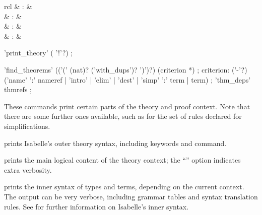 \begin{isabellebody}
\begin{isamarkuptext}
\begin{matharray}{rcl}
    \mbox{}\isa{{\isachardoublequote}\isactrlsup {\isacharasterisk}{\isachardoublequote}} & : &  \\
    \mbox{}\isa{{\isachardoublequote}\isactrlsup {\isacharasterisk}{\isachardoublequote}} & : &  \\
    \mbox{}\isa{{\isachardoublequote}\isactrlsup {\isacharasterisk}{\isachardoublequote}} & : &  \\
    \mbox{}\isa{{\isachardoublequote}\isactrlsup {\isacharasterisk}{\isachardoublequote}} & : &  \\
  \end{matharray}

  \begin{rail}
    'print\_theory' ( '!'?)
    ;

    'find\_theorems' (('(' (nat)? ('with\_dups')? ')')?) (criterion *)
    ;
    criterion: ('-'?) ('name' ':' nameref | 'intro' | 'elim' | 'dest' |
      'simp' ':' term | term)
    ;
    'thm\_deps' thmrefs
    ;
  \end{rail}

  These commands print certain parts of the theory and proof context.
  Note that there are some further ones available, such as for the set
  of rules declared for simplifications.

  \begin{descr}
  
  \item [\mbox{\isa{\isacommand{print{\isacharunderscore}commands}}}] prints Isabelle's outer theory
  syntax, including keywords and command.
  
  \item [\mbox{\isa{\isacommand{print{\isacharunderscore}theory}}}] prints the main logical content of
  the theory context; the ``\isa{{\isachardoublequote}{\isacharbang}{\isachardoublequote}}'' option indicates extra
  verbosity.

  \item [\mbox{\isa{\isacommand{print{\isacharunderscore}syntax}}}] prints the inner syntax of types
  and terms, depending on the current context.  The output can be very
  verbose, including grammar tables and syntax translation rules.  See
  \cite[\S7, \S8]{isabelle-ref} for further information on Isabelle's
  inner syntax.
  

\end{descr}
\end{isamarkuptext}
\end{isabellebody}
